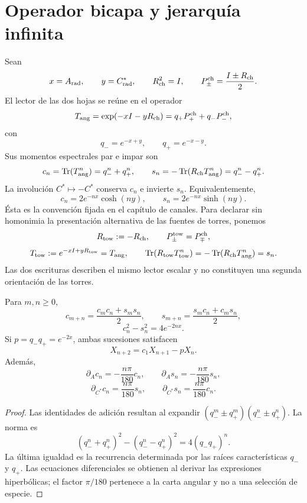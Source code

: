 \section{Operador bicapa y jerarquía infinita}
\label{sec:jerarquia-espectral-infinita-rev7}

Sean
\[
 x=A_{\rm rad},\qquad y=C^*_{\rm rad},\qquad
 R_{\rm ch}^2=I,\qquad
 P_\pm^{\rm ch}=\frac{I\pm R_{\rm ch}}2.
\]
El lector de las dos hojas se reúne en el operador
\[
 T_{\rm ang}=\exp(-xI-yR_{\rm ch})
 =q_+P_+^{\rm ch}+q_-P_-^{\rm ch},
\]
con
\[
 q_-=e^{-x+y},\qquad q_+=e^{-x-y}.
\]
Sus momentos espectrales par e impar son
\[
 c_n=\operatorname{Tr}(T_{\rm ang}^n)=q_-^n+q_+^n,\qquad
 s_n=-\operatorname{Tr}(R_{\rm ch}T_{\rm ang}^n)=q_-^n-q_+^n.
\]
La involución \(C^*\mapsto-C^*\) conserva \(c_n\) e invierte \(s_n\).
Equivalentemente,
\[
 c_n=2e^{-nx}\cosh(ny),\qquad
 s_n=2e^{-nx}\sinh(ny).
\]
Ésta es la convención fijada en el capítulo de canales. Para declarar sin
homonimia la presentación alternativa de las fuentes de torres, ponemos
\[
 R_{\rm tow}:=-R_{\rm ch},\qquad
 P_\pm^{\rm tow}=P_\mp^{\rm ch},
\]
\[
 T_{\rm tow}:=e^{-xI+yR_{\rm tow}}=T_{\rm ang},\qquad
 \operatorname{Tr}(R_{\rm tow}T_{\rm tow}^n)
 =-\operatorname{Tr}(R_{\rm ch}T_{\rm ang}^n)=s_n.
\]
Las dos escrituras describen el mismo lector escalar y no constituyen una
segunda orientación de las torres.

\begin{theorem}
\label{thm:recurrencia-bicapa-rev7}
Para \(m,n\ge0\),
\[
 c_{m+n}=\frac{c_mc_n+s_ms_n}{2},\qquad
 s_{m+n}=\frac{s_mc_n+c_ms_n}{2},
\]
\[
 c_n^2-s_n^2=4e^{-2nx}.
\]
Si \(p=q_-q_+=e^{-2x}\), ambas sucesiones satisfacen
\[
 X_{n+2}=c_1X_{n+1}-pX_n.
\]
Además,
\[
 \partial_Ac_n=-\frac{n\pi}{180}c_n,
 \qquad
 \partial_As_n=-\frac{n\pi}{180}s_n,
\]
\[
 \partial_{C^*}c_n=\frac{n\pi}{180}s_n,
 \qquad
 \partial_{C^*}s_n=\frac{n\pi}{180}c_n.
\]
\end{theorem}

\begin{proof}
Las identidades de adición resultan al expandir
\((q_-^m\pm q_+^m)(q_-^n\pm q_+^n)\). La norma es
\[
 (q_-^n+q_+^n)^2-(q_-^n-q_+^n)^2
 =4(q_-q_+)^n.
\]
La última igualdad es la recurrencia determinada por las raíces
características \(q_-\) y \(q_+\). Las ecuaciones diferenciales se obtienen
al derivar las expresiones hiperbólicas; el factor \(\pi/180\) pertenece a
la carta angular y no a una selección de especie.
\end{proof}

